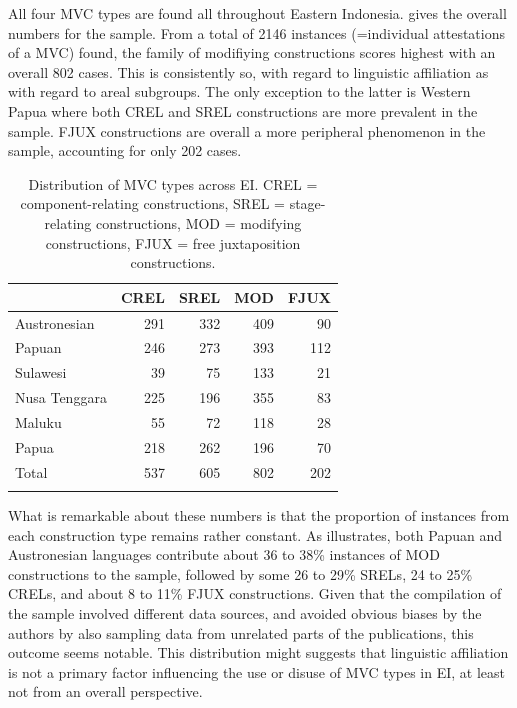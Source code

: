 All four MVC types are found all throughout Eastern Indonesia.  gives the overall numbers for the sample. From a total of 2146 instances (=individual attestations of a MVC) found, the family of modifiying constructions scores highest with an overall 802 cases. This is consistently so, with regard to linguistic affiliation as with regard to areal subgroups. The only exception to the latter is Western Papua where both CREL and SREL constructions are more prevalent in the sample. FJUX constructions are overall a more peripheral phenomenon in the sample, accounting for only 202 cases.

\begin{table}
\begin{tabular}{lrrrr}
  \lsptoprule
 & CREL & SREL & MOD & FJUX \tabularnewline 
  \midrule
  Austronesian & 291 & 332 & 409 & 90 \tabularnewline
  Papuan & 246 & 273 &  393 &  112  \tabularnewline
   \midrule
  Sulawesi & 39 & 75 & 133 & 21 \tabularnewline
  Nusa Tenggara & 225 & 196 & 355 & 83 \tabularnewline
  Maluku & 55 & 72 & 118 & 28 \tabularnewline 
  Papua & 218 & 262 & 196 & 70 \tabularnewline 
\midrule
Total & 537 & 605 & 802 & 202 \tabularnewline
\lspbottomrule
\end{tabular}
\caption[Distribution of MVC types]{Distribution of MVC types across EI. CREL = component-relating constructions, SREL = stage-relating constructions, MOD = modifying constructions, FJUX = free juxtaposition constructions.}
\label{table:MVCtypes_overview}
\end{table}

What is remarkable about these numbers is that the proportion of instances from each construction type remains rather constant. As  illustrates, both Papuan and Austronesian languages contribute about 36 to 38\% instances of MOD constructions to the sample, followed by some 26 to 29\% SRELs, 24 to 25\% CRELs, and about 8 to 11\% FJUX constructions. Given that the compilation of the sample involved different data sources, and avoided obvious biases by the authors by also sampling data from unrelated parts of the publications, this outcome seems notable. This distribution might suggests that linguistic affiliation is not a primary factor influencing the use or disuse of MVC types in EI, at least not from an overall perspective.

